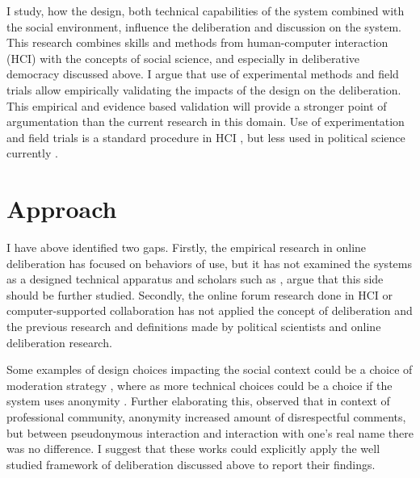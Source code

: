 \documentclass{article}
\begin{document}
I study, how the design, both technical capabilities of the system combined with the social environment, influence the deliberation and discussion on the system. This research combines skills and methods from human-computer interaction (HCI) with the concepts of social science, and especially in deliberative democracy discussed above. I argue that use of experimental methods and field trials allow empirically validating the impacts of the design on the deliberation. This empirical and evidence based validation will provide a stronger point of argumentation than the current research in this domain. Use of experimentation and field trials is a standard procedure in HCI , but less used in political science currently .


\section{Approach}

I have above identified two gaps. Firstly, the empirical research in online deliberation has focused on behaviors of use, but it has not examined the systems as a designed technical apparatus and scholars such as , argue that this side should be further studied. Secondly, the online forum research done in HCI or computer-supported collaboration has not applied the concept of deliberation and the previous research and definitions made by political scientists and online deliberation research. 


Some examples of design choices impacting the social context could be a choice of moderation strategy \cite{wright07}, where as more technical choices could be a choice if the system uses anonymity \cite{kilner05}. Further elaborating this,  observed that in context of professional community, anonymity increased amount of disrespectful comments, but between pseudonymous interaction and interaction with one's real name there was no difference. I suggest that these works could explicitly apply the well studied framework of deliberation discussed above to report their findings.
\end{document}
